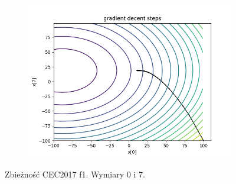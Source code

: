 \begin{figure}[h!]
\begin{subfigure}[b]{0.45\linewidth}
			\includegraphics[width=\linewidth]{photos/f1_3_1.png}
		\end{subfigure}
		\caption{Zbieżność CEC2017 f1. Wymiary 0 i 7.}
	\end{figure}
	\newpage
